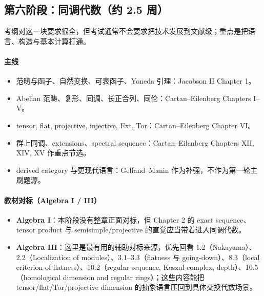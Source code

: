 \documentclass[12pt,a4paper]{ctexart}
\begin{document}
\subsection{第六阶段：同调代数（约 2.5 周）}

考纲对这一块要求很全，但考试通常不会要求把技术发展到文献级；重点是把语言、构造与基本计算打通。

\paragraph{主线}
\begin{itemize}
  \item 范畴与函子、自然变换、可表函子、Yoneda 引理：Jacobson II Chapter 1。
  \item Abelian 范畴、复形、同调、长正合列、同伦：Cartan--Eilenberg Chapters I--V。
  \item tensor, flat, projective, injective, Ext, Tor：Cartan--Eilenberg Chapter VI。
  \item 群上同调、extensions、spectral sequence：Cartan--Eilenberg Chapters XII, XIV, XV 作重点节选。
  \item derived category 与更现代语言：Gelfand--Manin 作为补强，不作为第一轮主刷题源。
\end{itemize}

\paragraph{教材对标（Algebra I / III）}
\begin{itemize}
  \item \textbf{Algebra I}：本阶段没有整章正面对标，但 Chapter 2 的 exact sequence、tensor product 与 semisimple/projective 的直觉应当带着进入同调代数。
  \item \textbf{Algebra III}：这里是最有用的辅助对标来源，优先回看 1.2（Nakayama）、2.2（Localization of modules）、3.1--3.3（flatness 与 going-down）、8.3（local criterion of flatness）、10.2（regular sequence, Koszul complex, depth）、10.5（homological dimension and regular rings）；这些内容能把 tensor/flat/Tor/projective dimension 的抽象语言压回到具体交换代数场景。
\end{itemize}
\end{document}
